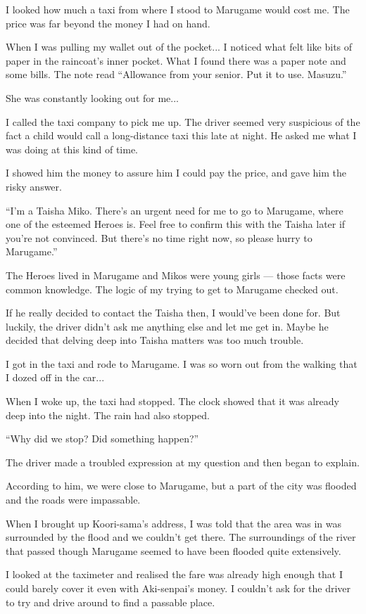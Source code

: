 I looked how much a taxi from where I stood to Marugame would cost me. The price was far beyond the money I had on hand.

When I was pulling my wallet out of the pocket... I noticed what felt like bits of paper in the raincoat's inner pocket. What I found there was a paper note and some bills. The note read ``Allowance from your senior. Put it to use. Masuzu.''

She was constantly looking out for me...

I called the taxi company to pick me up. The driver seemed very suspicious of the fact a child would call a long-distance taxi this late at night. He asked me what I was doing at this kind of time.

I showed him the money to assure him I could pay the price, and gave him the risky answer.

``I'm a Taisha Miko. There's an urgent need for me to go to Marugame, where one of the esteemed Heroes is. Feel free to confirm this with the Taisha later if you're not convinced. But there's no time right now, so please hurry to Marugame.''

The Heroes lived in Marugame and Mikos were young girls --- those facts were common knowledge. The logic of my trying to get to Marugame checked out.

If he really decided to contact the Taisha then, I would've been done for. But luckily, the driver didn't ask me anything else and let me get in. Maybe he decided that delving deep into Taisha matters was too much trouble.

I got in the taxi and rode to Marugame. I was so worn out from the walking that I dozed off in the car...

When I woke up, the taxi had stopped. The clock showed that it was already deep into the night. The rain had also stopped.

``Why did we stop? Did something happen?''

The driver made a troubled expression at my question and then began to explain.

According to him, we were close to Marugame, but a part of the city was flooded and the roads were impassable.

When I brought up Koori-sama's address, I was told that the area was in was surrounded by the flood and we couldn't get there. The surroundings of the river that passed though Marugame seemed to have been flooded quite extensively.

I looked at the taximeter and realised the fare was already high enough that I could barely cover it even with Aki-senpai's money. I couldn't ask for the driver to try and drive around to find a passable place.

